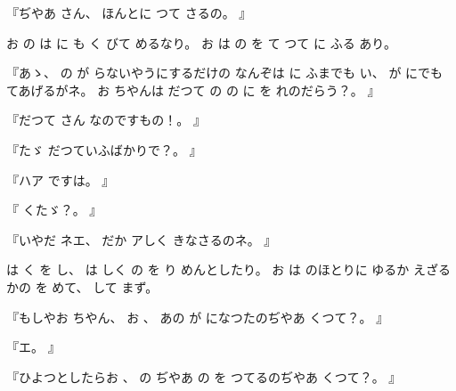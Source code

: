 
『ぢやあ
さん、
%
ほんとに
つて
さるの。
』

お
の
は
に
も
く
びて
めるなり。
%
お
は
の
を
て
つて
に
ふる
あり。

『あゝ、
%
の
が
らないやうにするだけの
なんぞは
に
ふまでも
い、
%
が
にでも
てあげるがネ。
%
お
ちやんは
だつて
の
の
に
を
れのだらう？。
』

『だつて
さん
なのですもの！。%
』

『たゞ
だつていふばかりで？。%
』

『ハア
ですは。
』

『
くたゞ？。
』

『いやだ
ネエ、
%
だか
アしく
きなさるのネ。
』

は
く
を
し、
%
は
しく
の
を
り
めんとしたり。
%
お
は
のほとりに
ゆるか
えざるかの
を
めて、
%
して
まず。

『もしやお
ちやん、
%
お
、
%
あの
が
になつたのぢやあ
くつて？。
』

『エ。
』

『ひよつとしたらお
、
%
の
ぢやあ
の
を
つてるのぢやあ
くつて？。
』

